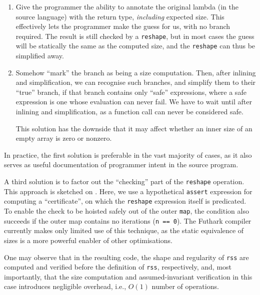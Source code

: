 \begin{enumerate}
\item Give the programmer the ability to annotate the original lambda
  (in the source language) with the return type, \textit{including}
  expected size.  This effectively lets the programmer make the guess
  for us, with no branch required.  The result is still checked by a
  \lstinline{reshape}, but in most cases the guess will be statically
  the same as the computed size, and the \lstinline{reshape} can thus
  be simplified away.
\item Somehow ``mark'' the branch as being a size computation.  Then,
  after inlining and simplification, we can recognise such branches,
  and simplify them to their ``true'' branch, if that branch contains
  only ``safe'' expressions, where a safe expression is one whose
  evaluation can never fail.  We have to wait until after inlining and
  simplification, as a function call can never be considered safe.

  This solution has the downside that it may affect whether an inner
  size of an empty array is zero or nonzero.
\end{enumerate}

In practice, the first solution is preferable in the vast majority of
cases, as it also serves as useful documentation of programmer intent
in the source program.

A third solution is to factor out the ``checking'' part of the
\lstinline{reshape} operation.  This approach is sketched on
.  Here, we use a hypothetical
\lstinline{assert} expression for computing a ``certificate'', on
which the \lstinline{reshape} expression itself is predicated.  To
enable the check to be hoisted safely out of the outer
\lstinline{map}, the condition also succeeds if the outer map contains
no iterations (\lstinline{n == 0}).  The Futhark compiler currently
makes only limited use of this technique, as the static equivalence of
sizes is a more powerful enabler of other optimisations.

One may observe that in the resulting code, the shape and regularity
of \texttt{rss} are computed and verified before the definition of
\texttt{rss}, respectively, and, most importantly, that the size
computation and assumed-invariant verification in this case introduces
negligible overhead, i.e., $O(1)$ number of operations.

